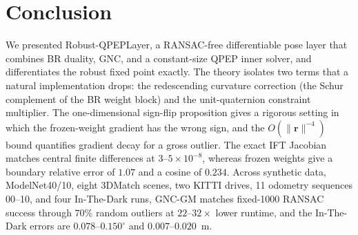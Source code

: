 \section{Conclusion}
\label{sec:conclusion}

We presented Robust-QPEPLayer, a RANSAC-free differentiable pose layer that combines BR duality,
GNC, and a constant-size QPEP inner solver, and differentiates the robust fixed point exactly. The
theory isolates two terms that a natural implementation drops: the redescending curvature
correction (the Schur complement of the BR weight block) and the unit-quaternion constraint
multiplier. The one-dimensional sign-flip proposition gives a rigorous setting in which the
frozen-weight gradient has the wrong sign, and the $O(\|\mathbf{r}\|^{-4})$ bound quantifies gradient
decay for a gross outlier. The exact IFT Jacobian matches central finite differences at
$3$--$5\times10^{-8}$, whereas frozen weights give a boundary relative error of $1.07$ and a cosine
of $0.234$. Across synthetic data, ModelNet40/10, eight 3DMatch scenes, two KITTI drives, 11 odometry
sequences 00--10, and four In-The-Dark runs, GNC-GM matches fixed-1000 RANSAC success through $70\%$
random outliers at $22$--$32\times$ lower runtime, and the In-The-Dark errors are
$0.078$--$0.150^\circ$ and $0.007$--$0.020$~m.
